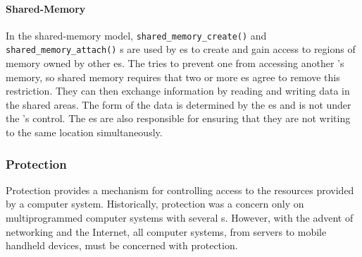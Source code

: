 \paragraph{Shared-Memory}\label{par:Shared_Memory}
In the shared-memory model, \texttt{shared_memory_create()} and \texttt{shared_memory_attach()} s are used by es to create and gain access to regions of memory owned by other es.
The  tries to prevent one  from accessing another ’s memory, so shared memory requires that two or more es agree to remove this restriction.
They can then exchange information by reading and writing data in the shared areas.
The form of the data is determined by the es and is not under the ’s control.
The es are also responsible for ensuring that they are not writing to the same location simultaneously.

\subsubsection{Protection}\label{subsubsec:Protection}
Protection provides a mechanism for controlling access to the resources provided by a computer system.
Historically, protection was a concern only on multiprogrammed computer systems with several s.
However, with the advent of networking and the Internet, all computer systems, from servers to mobile handheld devices, must be concerned with protection.

